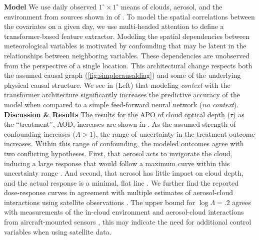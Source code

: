 \textbf{Model}
We use daily observed $1^{\circ} \times 1^{\circ}$ means of clouds, aerosol, and the environment from sources shown in  of . 
To model the spatial correlations between the covariates on a given day, we use multi-headed attention \citep{vaswani2017attention} to define a transformer-based feature extractor.
Modeling the spatial dependencies between meteorological variables is motivated by confounding that may be latent in the relationships between neighboring variables.
These dependencies are unobserved from the perspective of a single location.
This architectural change respects both the assumed causal graph (\cref{fig:simplecausaldiag}) and some of the underlying physical causal structure.
We see in  (Left) that modeling \emph{context} with the transformer architecture significantly increases the predictive accuracy of the model when compared to a simple feed-forward neural network (\emph{no context}).
\textbf{Discussion \& Results}
The results for the APO of cloud optical depth (\(\tau\)) as the ``treatment'', AOD, increases are shown in . 
As the assumed strength of confounding increases (\(\Lambda > 1\)), the range of uncertainty in the treatment outcome increases. 
Within this range of confounding, the modeled outcomes agree with two conflicting hypotheses.
First, that aerosol acts to invigorate the cloud, inducing a large response that would follow a maximum curve within this uncertainty range \citep{christensen2011microphysical, douglas2021global}. 
And second, that aerosol has little impact on cloud depth, and the actual response is a minimal, flat line \citep{gryspeerdt2019constraining}. 
We further find the reported dose-response curves in agreement with multiple estimates of aerosol-cloud interactions using satellite observations \citep{breon2002aerosol, myhre2007aerosol, toll2019weak}. 
The upper bound for $\log \Lambda = .2$ agrees with measurements of the in-cloud environment and aerosol-cloud interactions from aircraft-mounted sensors \citep{painemal2013first}, this may indicate the need for additional control variables when using satellite data.

